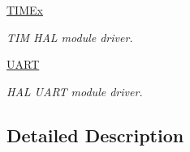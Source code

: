 \begin{DoxyCompactItemize}
\mbox{\hyperlink{group___t_i_m_ex}{T\+I\+M\+Ex}}
\begin{DoxyCompactList}\small\item\em T\+IM H\+AL module driver. \end{DoxyCompactList}\item 
\mbox{\hyperlink{group___u_a_r_t}{U\+A\+RT}}
\begin{DoxyCompactList}\small\item\em H\+AL U\+A\+RT module driver. \end{DoxyCompactList}\end{DoxyCompactItemize}


\subsection{Detailed Description}
